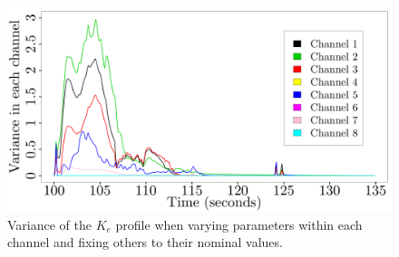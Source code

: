 \documentclass{article}
\begin{document}
\begin{figure}[h]
\begin{center}
\includegraphics[scale=.25]{Figures/Channel_Variance_Comparison.pdf}
\end{center}
\caption{Variance of the $K_e$ profile when varying parameters within each channel and fixing others to their nominal values.}
\label{fig:channelwise_variances}
\end{figure}

\newpage
\end{document}
